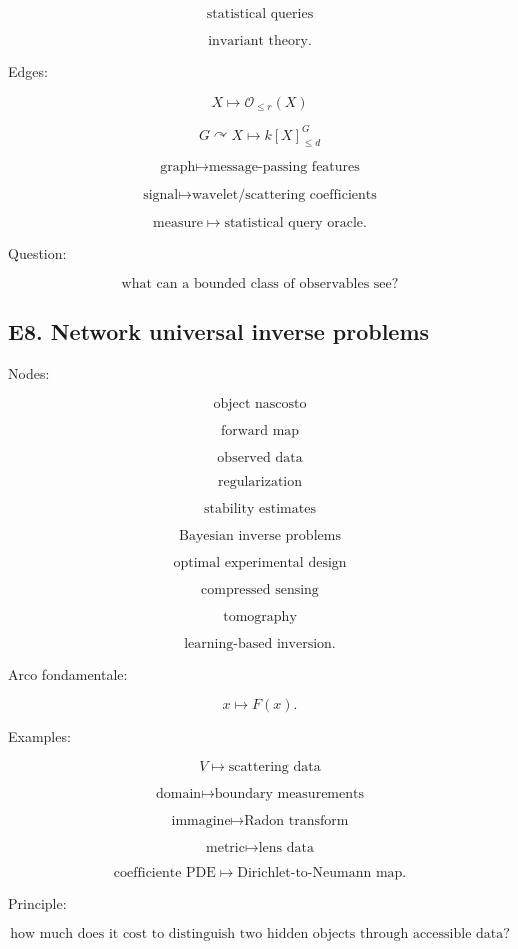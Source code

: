 \documentclass[11pt]{article}
\begin{document}
\[
\text{statistical queries}
\]

\[
\text{invariant theory}.
\]

Edges:

\[
X\mapsto \mathcal O_{\le r}(X)
\]

\[
G\curvearrowright X\mapsto k[X]^G_{\le d}
\]

\[
\text{graph}\mapsto \text{message-passing features}
\]

\[
\text{signal}\mapsto \text{wavelet/scattering coefficients}
\]

\[
\text{measure}\mapsto \text{statistical query oracle}.
\]

Question:

\[
\text{what can a bounded class of observables see?}
\]



\subsection{E8. Network universal inverse problems}

Nodes:

\[
\text{object nascosto}
\]

\[
\text{forward map}
\]

\[
\text{observed data}
\]

\[
\text{regularization}
\]

\[
\text{stability estimates}
\]

\[
\text{Bayesian inverse problems}
\]

\[
\text{optimal experimental design}
\]

\[
\text{compressed sensing}
\]

\[
\text{tomography}
\]

\[
\text{learning-based inversion}.
\]

Arco fondamentale:

\[
x\mapsto F(x).
\]

Examples:

\[
V\mapsto \text{scattering data}
\]

\[
\text{domain}\mapsto \text{boundary measurements}
\]

\[
\text{immagine}\mapsto \text{Radon transform}
\]

\[
\text{metric}\mapsto \text{lens data}
\]

\[
\text{coefficiente PDE}\mapsto \text{Dirichlet-to-Neumann map}.
\]

Principle:

\[
\text{how much does it cost to distinguish two hidden objects through accessible data?}
\]
\end{document}
